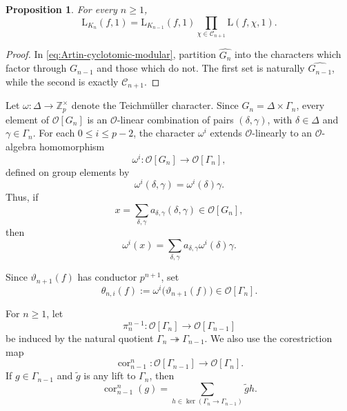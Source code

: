 \documentclass[11pt,table]{amsart}
\newtheorem{proposition}[theorem]{Proposition}
\newcommand{\Z}{\mathbb{Z}}
\numberwithin{equation}{section}
\begin{document}
\begin{proposition}
\label{prop:successive-base-change-factorization}
For every \(n\geq1\),
\begin{equation}
\label{eq:primitive-base-change-factorization-s1}
        \mathrm{L}_{K_n}(f,1)
        =
        \mathrm{L}_{K_{n-1}}(f,1)
        \prod_{\chi\in\mathcal C_{n+1}}
        \mathrm{L}(f,\chi,1).
\end{equation}
\end{proposition}

\begin{proof}
In \eqref{eq:Artin-cyclotomic-modular}, partition
\(\widehat{G_n}\) into the characters which factor through \(G_{n-1}\)
and those which do not.  The first set is naturally
\(\widehat{G_{n-1}}\), while the second is exactly
\(\mathcal C_{n+1}\).
\end{proof}
\par Let $\omega:\Delta\to\Z_p^\times$ denote the Teichm\"uller character.
Since $G_n=\Delta\times\Gamma_n$, every element of $\mathcal O[G_n]$
is an $\mathcal O$-linear combination of pairs $(\delta,\gamma)$, with
$\delta\in\Delta$ and $\gamma\in\Gamma_n$. For each
$0\leq i\leq p-2$, the character $\omega^i$ extends
$\mathcal O$-linearly to an $\mathcal O$-algebra homomorphism
\[
        \omega^i:\mathcal O[G_n]\longrightarrow\mathcal O[\Gamma_n],
\]
defined on group elements by
\[
        \omega^i(\delta,\gamma)=\omega^i(\delta)\gamma.
\]
Thus, if
\[
        x=\sum_{\delta,\gamma}
        a_{\delta,\gamma}(\delta,\gamma)\in\mathcal O[G_n],
\]
then
\[
        \omega^i(x)
        =
        \sum_{\delta,\gamma}
        a_{\delta,\gamma}\omega^i(\delta)\gamma.
\]

\par Since \(\vartheta_{n+1}(f)\) has conductor \(p^{n+1}\), set
\begin{equation}
\label{thetaeqn}
        \theta_{n,i}(f)
        :=
        \omega^i\bigl(\vartheta_{n+1}(f)\bigr)
        \in
        \mathcal O[\Gamma_n].
\end{equation}
\par For \(n\geq1\), let
\[
        \pi_n^{n-1}:
        \mathcal O[\Gamma_n]
        \longrightarrow
        \mathcal O[\Gamma_{n-1}]
\]
be induced by the natural quotient
\(\Gamma_n\twoheadrightarrow\Gamma_{n-1}\).  We also use the
corestriction map
\[
        \operatorname{cor}_{n-1}^n:
        \mathcal O[\Gamma_{n-1}]
        \longrightarrow
        \mathcal O[\Gamma_n].
\]
If \(g\in\Gamma_{n-1}\) and \(\widetilde g\) is any lift to
\(\Gamma_n\), then
\[
        \operatorname{cor}_{n-1}^n(g)
        =
        \sum_{h\in\ker(\Gamma_n\to\Gamma_{n-1})}
        \widetilde g h.
\]
\end{document}
